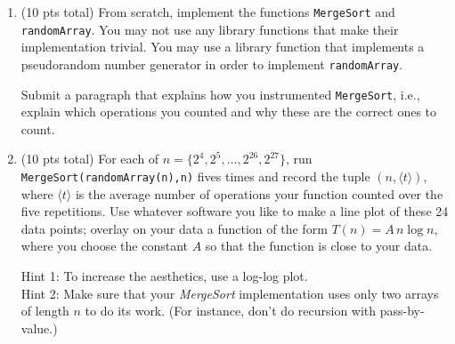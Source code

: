 \documentclass[12pt]{article}
\begin{document}
\begin{enumerate}
	\begin{enumerate}
            \item (10 pts total) \label{3a} From scratch, implement the functions {\tt MergeSort} and {\tt
            randomArray}. You may not use any library functions that make their
                implementation trivial. You may use a library function that
                implements a pseudorandom number generator in order to
                implement {\tt randomArray}. 
	
        Submit a paragraph that explains how you instrumented {\tt MergeSort},
                i.e., explain which operations you counted and why these are
                the correct ones to count.
\pagebreak
	
        \item (10 pts total)  \label{3b} For each of $n= \{2^{4},2^{5},\dots,2^{26},2^{27}\}$, run 
            {\tt MergeSort(randomArray(n),n)} fives times and record the tuple
            $(n,\langle t\rangle)$, where $\langle t\rangle$ is the average
            number of operations your function counted over the five
            repetitions. Use whatever software you like to make a line plot
            of these 24 data points; overlay on your data a function of the
            form $T(n) = A\,n \log n$, where you choose the constant $A$ so
            that the function is close to your data.
	
	Hint 1: To increase the aesthetics, use a log-log plot.\\
        Hint 2: Make sure that your \textit{MergeSort} implementation uses only
                two arrays of length $n$ to do its work. (For instance, don't
                do recursion with pass-by-value.)
\pagebreak
	
	\end{enumerate}
	

\end{enumerate}
\end{document}

